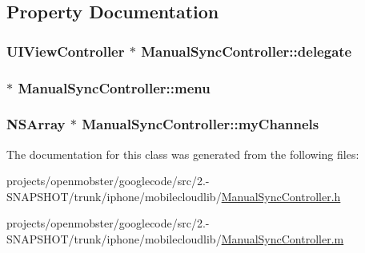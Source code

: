 \subsection{\-Property \-Documentation}
\hypertarget{interface_manual_sync_controller_a09de675d311ba65323b093f799df0fce}{
\subsubsection[{delegate}]{\setlength{\rightskip}{0pt plus 5cm}\-U\-I\-View\-Controller $\ast$ \-Manual\-Sync\-Controller\-::delegate}}
\label{interface_manual_sync_controller_a09de675d311ba65323b093f799df0fce}
\hypertarget{interface_manual_sync_controller_ad8b3c7d3fc85b97e40a966d4856eb3ff}{
\subsubsection[{menu}]{ $\ast$ \-Manual\-Sync\-Controller\-::menu}}
\label{interface_manual_sync_controller_ad8b3c7d3fc85b97e40a966d4856eb3ff}
\hypertarget{interface_manual_sync_controller_a50520e0356c02c3a9bc8613aa6ddd22c}{
\subsubsection[{my\-Channels}]{\setlength{\rightskip}{0pt plus 5cm}\-N\-S\-Array $\ast$ \-Manual\-Sync\-Controller\-::my\-Channels}}
\label{interface_manual_sync_controller_a50520e0356c02c3a9bc8613aa6ddd22c}


\-The documentation for this class was generated from the following files\-:\begin{DoxyCompactItemize}
\item 
projects/openmobster/googlecode/src/2.-\/\-S\-N\-A\-P\-S\-H\-O\-T/trunk/iphone/mobilecloudlib/\hyperlink{_manual_sync_controller_8h}{\-Manual\-Sync\-Controller.\-h}\item 
projects/openmobster/googlecode/src/2.-\/\-S\-N\-A\-P\-S\-H\-O\-T/trunk/iphone/mobilecloudlib/\hyperlink{_manual_sync_controller_8m}{\-Manual\-Sync\-Controller.\-m}\end{DoxyCompactItemize}
